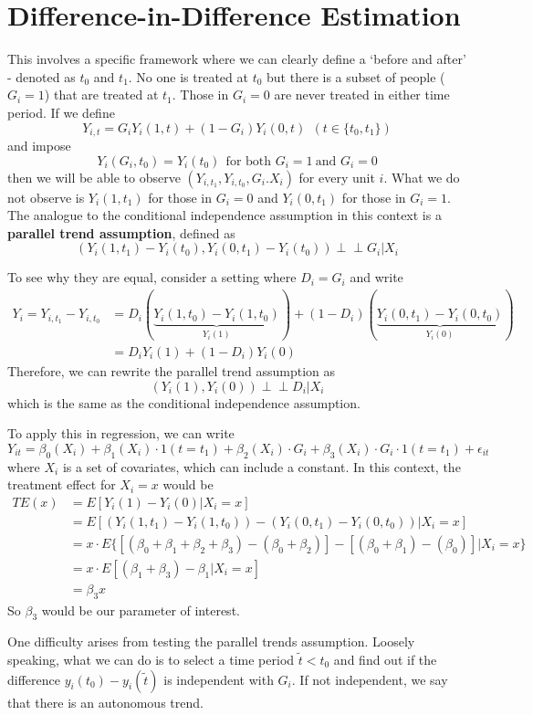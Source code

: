 \section{Difference-in-Difference Estimation}
This involves a specific framework where we can clearly define a `before and after' - denoted as $t_0$ and $t_1$. No one is treated at $t_0$ but there is a subset of people ($G_i=1$) that are treated at $t_1$. Those in $G_i=0$ are never treated in either time period. If we define
\[
Y_{i,t}=G_iY_{i}(1,t)+(1-G_i)Y_{i}(0,t) \ \ (t\in\{t_0, t_1\})
\]
and impose
\[
Y_i(G_i, t_0)=Y_{i}(t_0) \ \ \text{for both }G_i=1 \ \text{and }G_i=0 
\]
then we will be able to observe $(Y_{i,t_1}, Y_{i,t_0},G_i. X_i)$ for every unit $i$. What we do not observe is $Y_i(1,t_1)$ for those in $G_i=0$ and $Y_i(0,t_1)$ for those in $G_i=1$.  The analogue to the conditional independence assumption in this context is a \textbf{parallel trend assumption}, defined as
\[
(Y_i(1,t_1)-Y_i(t_0), Y_i(0,t_1)-Y_i(t_0)) \perp\!\!\! \perp G_i|X_i
\]\par
To see why they are equal, consider a setting where $D_i=G_i$ and write
\begin{align*}
Y_i = Y_{i,t_1}-Y_{i,t_0}&=D_i(\underbrace{Y_i(1,t_0)-Y_i(1,t_0)}_{Y_i(1)})+(1-D_i)(\underbrace{Y_i(0,t_1)-Y_i(0,t_0)}_{Y_i(0)})\\
&=D_iY_i(1) + (1-D_i)Y_i(0)
\end{align*}
Therefore, we can rewrite the parallel trend assumption as
\[
(Y_i(1), Y_i(0)) \perp\!\!\! \perp D_i|X_i
\]
which is the same as the conditional independence assumption. \par
To apply this in regression, we can write
\[
Y_{it}=\beta_0(X_i)+\beta_1(X_i)\cdot1(t=t_1)+\beta_2(X_i)\cdot G_i + \beta_3(X_i)\cdot G_i\cdot1(t=t_1)+\epsilon_{it}
\]
where $X_i$ is a set of covariates, which can include a constant. In this context, the treatment effect for $X_i=x$ would be
\begin{align*}
TE(x)&=E[Y_i(1)-Y_i(0)|X_i=x]\\
&=E[(Y_i(1,t_1)-Y_i(1,t_0))-(Y_i(0,t_1)-Y_i(0,t_0))|X_i=x]\\
&=x\cdot E\{[(\beta_0+\beta_1+\beta_2+\beta_3)-(\beta_0+\beta_2)]-[(\beta_0+\beta_1)-(\beta_0)]|X_i=x\}\\
&=x\cdot E[(\beta_1+\beta_3)-\beta_1|X_i=x]\\
&=\beta_3 x
\end{align*}
So $\beta_3$ would be our parameter of interest. \par
One difficulty arises from testing the parallel trends assumption. Loosely speaking, what we can do is to select a time period $\tilde{t}<t_0$ and find out if the difference $y_i(t_0)-y_i(\tilde{t})$ is independent with $G_i$. If not independent, we say that there is an autonomous trend. 




